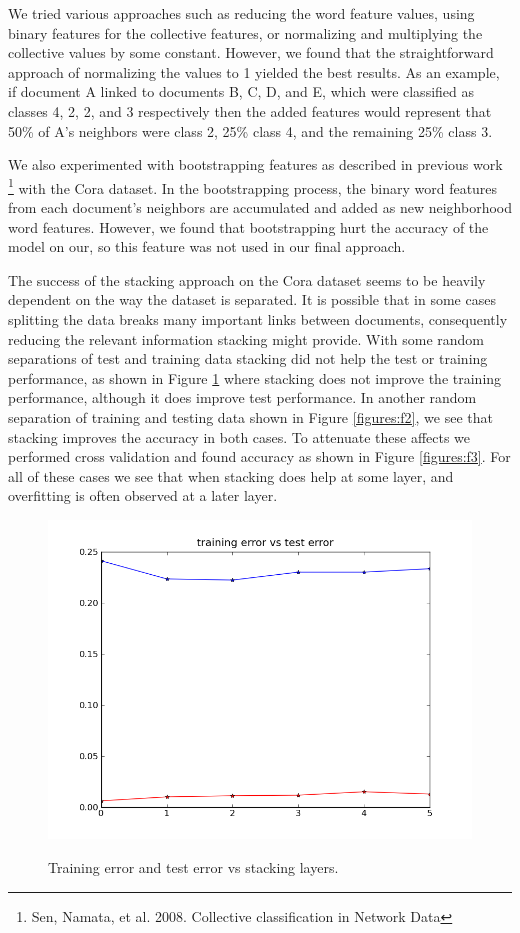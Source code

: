 \documentclass[a4paper,11pt]{article}
\begin{document}
We tried various approaches such as reducing the word feature 
values, using binary features for the collective features, or normalizing 
and multiplying the collective values by some constant. However, we found
that the straightforward approach of normalizing the values to 1 yielded 
the best results. As an example, if document A linked to documents 
B, C, D, and E, which were classified as classes 4, 2, 2, and 3
respectively then the added features would represent that 50\% of A's neighbors 
were class 2, 25\% class 4, and the remaining 25\% class 3. 

We also experimented with bootstrapping features as described in previous work
\footnote{Sen, Namata, et al. 2008. Collective classification in Network Data}
with the Cora dataset. In the bootstrapping process, the binary word features from
each document's neighbors are accumulated and added as new neighborhood word features.
However, we found that bootstrapping hurt the accuracy of the model on our, so this
feature was not used in our final approach.

The success of the stacking approach on the Cora dataset seems to be heavily
dependent on the way the dataset is separated. It is possible that in some 
cases splitting the data breaks many important links between documents,
consequently reducing the relevant information stacking might provide. 
With some random separations of test and training data stacking did not help
the test or training performance, as shown in Figure \ref{figures:f1} where
stacking does not improve the training performance, although it does improve
test performance. In another random separation of training and testing data 
shown in Figure \ref{figures:f2}, we see that stacking improves the accuracy 
in both cases. To attenuate these affects we performed cross validation and 
found accuracy as shown in Figure \ref{figures:f3}. For all of these cases we 
see that when stacking does help at some layer, and overfitting is often observed at a later layer.

\begin{figure}[!ht]
  \caption{Training error and test error vs stacking layers.}
  \centering
  \includegraphics[width=4.5in]{WU5/trainingvstestD3R.png}
  \label{figures:f1}
\end{figure}
\end{document}
